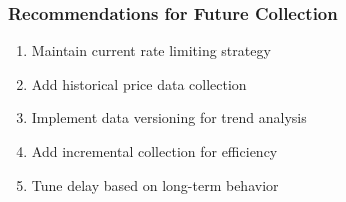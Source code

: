 \documentclass[12pt,a4paper]{article}
\begin{document}
\subsubsection{Recommendations for Future Collection}

\begin{enumerate}
  \item Maintain current rate limiting strategy
  \item Add historical price data collection
  \item Implement data versioning for trend analysis
  \item Add incremental collection for efficiency
  \item Tune delay based on long-term behavior
\end{enumerate}
\end{document}
